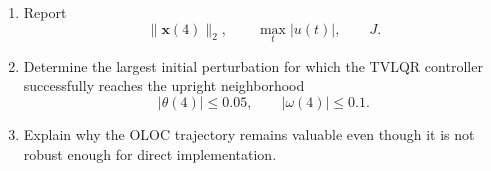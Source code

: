 \begin{enumerate}
    \item Report
    \begin{equation}
    \|\mathbf{x}(4)\|_2,
    \qquad
    \max_t|u(t)|,
    \qquad
    J.
    \end{equation}

    \item Determine the largest initial perturbation for which the TVLQR
    controller successfully reaches the upright neighborhood
    \begin{equation}
    |\theta(4)|\leq0.05,
    \qquad
    |\omega(4)|\leq0.1.
    \end{equation}

    \item Explain why the OLOC trajectory remains valuable even though it is
    not robust enough for direct implementation.
\end{enumerate}
